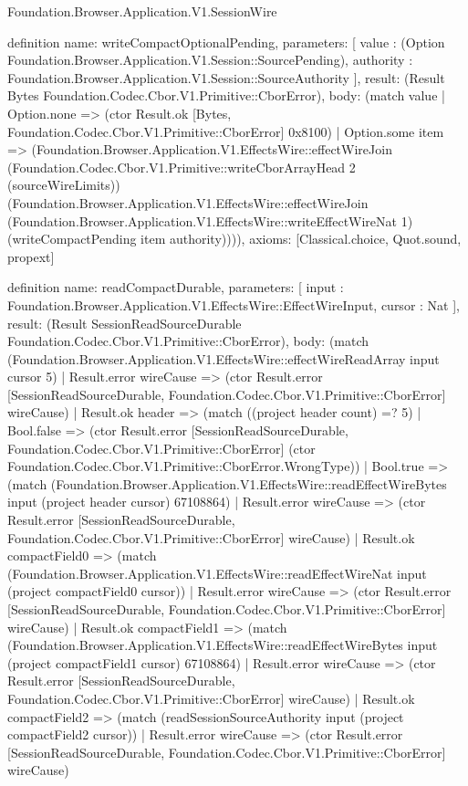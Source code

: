 \begin{lexlean}{Foundation.Browser.Application.V1.SessionWire}
\begin{semanticmodule}
definition{
  name: writeCompactOptionalPending,
  parameters: [
    value : (Option Foundation.Browser.Application.V1.Session::SourcePending),
    authority : Foundation.Browser.Application.V1.Session::SourceAuthority
  ],
  result: (Result Bytes Foundation.Codec.Cbor.V1.Primitive::CborError),
  body: (match value
    | Option.none => (ctor Result.ok [Bytes, Foundation.Codec.Cbor.V1.Primitive::CborError] 0x8100)
    | Option.some item => (Foundation.Browser.Application.V1.EffectsWire::effectWireJoin (Foundation.Codec.Cbor.V1.Primitive::writeCborArrayHead 2 (sourceWireLimits)) (Foundation.Browser.Application.V1.EffectsWire::effectWireJoin (Foundation.Browser.Application.V1.EffectsWire::writeEffectWireNat 1) (writeCompactPending item authority)))),
  axioms: [Classical.choice, Quot.sound, propext]
}

definition{
  name: readCompactDurable,
  parameters: [
    input : Foundation.Browser.Application.V1.EffectsWire::EffectWireInput,
    cursor : Nat
  ],
  result: (Result SessionReadSourceDurable Foundation.Codec.Cbor.V1.Primitive::CborError),
  body: (match (Foundation.Browser.Application.V1.EffectsWire::effectWireReadArray input cursor 5)
    | Result.error wireCause => (ctor Result.error [SessionReadSourceDurable, Foundation.Codec.Cbor.V1.Primitive::CborError] wireCause)
    | Result.ok header => (match ((project header count) =? 5)
      | Bool.false => (ctor Result.error [SessionReadSourceDurable, Foundation.Codec.Cbor.V1.Primitive::CborError] (ctor Foundation.Codec.Cbor.V1.Primitive::CborError.WrongType))
      | Bool.true => (match (Foundation.Browser.Application.V1.EffectsWire::readEffectWireBytes input (project header cursor) 67108864)
        | Result.error wireCause => (ctor Result.error [SessionReadSourceDurable, Foundation.Codec.Cbor.V1.Primitive::CborError] wireCause)
        | Result.ok compactField0 => (match (Foundation.Browser.Application.V1.EffectsWire::readEffectWireNat input (project compactField0 cursor))
          | Result.error wireCause => (ctor Result.error [SessionReadSourceDurable, Foundation.Codec.Cbor.V1.Primitive::CborError] wireCause)
          | Result.ok compactField1 => (match (Foundation.Browser.Application.V1.EffectsWire::readEffectWireBytes input (project compactField1 cursor) 67108864)
            | Result.error wireCause => (ctor Result.error [SessionReadSourceDurable, Foundation.Codec.Cbor.V1.Primitive::CborError] wireCause)
            | Result.ok compactField2 => (match (readSessionSourceAuthority input (project compactField2 cursor))
              | Result.error wireCause => (ctor Result.error [SessionReadSourceDurable, Foundation.Codec.Cbor.V1.Primitive::CborError] wireCause)
}
\end{semanticmodule}
\end{lexlean}
